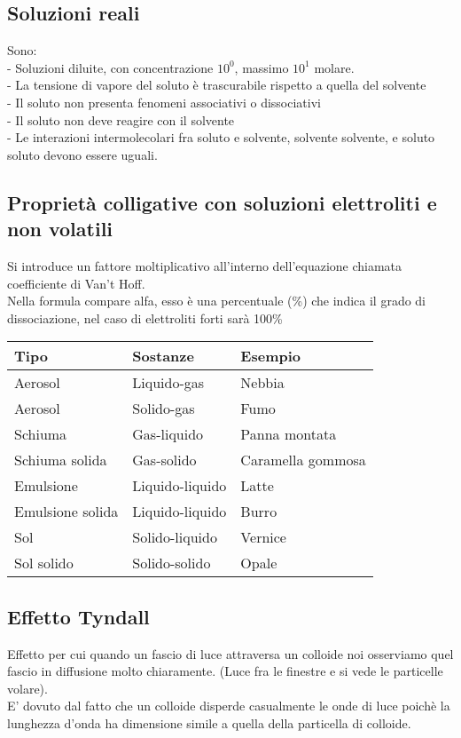 \subsection{Soluzioni reali}
Sono:\\
\tab- Soluzioni diluite, con concentrazione $10^0$, massimo $10^1$ molare.\\
\tab- La tensione di vapore del soluto è trascurabile rispetto a quella del solvente\\
\tab- Il soluto non presenta fenomeni associativi o dissociativi \\
\tab- Il soluto non deve reagire con il solvente\\
\tab- Le interazioni intermolecolari fra soluto e solvente, solvente solvente, e soluto soluto devono essere uguali. 
\subsection{Proprietà colligative con soluzioni elettroliti e non volatili}
Si introduce un fattore moltiplicativo all'interno dell'equazione chiamata coefficiente di Van't Hoff.\\
Nella formula compare alfa, esso è una percentuale (\%) che indica il grado di dissociazione, nel caso di elettroliti forti sarà 100\%\\
\begin{tabular}{|l|l|l|}\hline
  Tipo & Sostanze & Esempio \\\hline
  Aerosol & Liquido-gas & Nebbia\\\hline
  Aerosol & Solido-gas & Fumo\\\hline
  Schiuma & Gas-liquido & Panna montata\\\hline
  Schiuma solida & Gas-solido & Caramella gommosa\\\hline
  Emulsione & Liquido-liquido & Latte\\\hline
  Emulsione solida & Liquido-liquido & Burro\\\hline
  Sol & Solido-liquido & Vernice\\\hline
  Sol solido & Solido-solido & Opale\\\hline
\end{tabular}
\subsection{Effetto Tyndall}
Effetto per cui quando un fascio di luce attraversa un colloide noi osserviamo quel fascio in diffusione molto chiaramente. (Luce fra le finestre e si vede le particelle volare).\\
E' dovuto dal fatto che un colloide disperde casualmente le onde di luce poichè la lunghezza d'onda ha dimensione simile a quella della particella di colloide.
